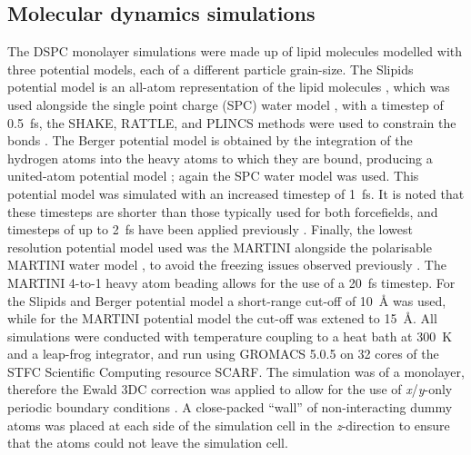 \documentclass[amsmath,amssymb,twocolumn,superscriptaddress]{revtex4-1}
\begin{document}
\subsection{Molecular dynamics simulations}
The DSPC monolayer simulations were made up of lipid molecules modelled with three potential models, each of a different particle grain-size.
The Slipids potential model is an all-atom representation of the lipid molecules \cite{jambeck_derivation_2012}, which was used alongside the single point charge (SPC) water model \cite{berendsen_missing_1987}, with a timestep of \SI{0.5}{\femto\second}, the SHAKE, RATTLE, and PLINCS methods were used to constrain the  bonds \cite{miyamoto_settle_1992,hess_p-lincs_2008}.
The Berger potential model is obtained by the integration of the hydrogen atoms into the heavy atoms to which they are bound, producing a united-atom potential model \cite{berger_molecular_1997}; again the SPC water model was used.
This potential model was simulated with an increased timestep of \SI{1}{\femto\second}.
It is noted that these timesteps are shorter than those typically used for both forcefields, and timesteps of up to \SI{2}{\femto\second} have been applied previously \cite{berger_molecular_1997,jambeck_derivation_2012}.
Finally, the lowest resolution potential model used was the MARTINI \cite{marrink_martini_2007} alongside the polarisable MARTINI water model \cite{yesylevskyy_polarizable_2010}, to avoid the freezing issues observed previously \cite{koutsioubas_combined_2016}.
The MARTINI 4-to-1 heavy atom beading allows for the use of a \SI{20}{\femto\second} timestep.
For the Slipids and Berger potential model a short-range cut-off of \SI{10}{\angstrom} was used, while for the MARTINI potential model the cut-off was extened to \SI{15}{\angstrom}.
All simulations were conducted with temperature coupling to a heat bath at \SI{300}{\kelvin} and a leap-frog integrator, and run using GROMACS 5.0.5 \cite{berendsen_gromacs_1995,lindahl_gromacs_2001,van_der_spoel_gromacs_2005,hess_gromacs_2008} on 32 cores of the STFC Scientific Computing resource SCARF.
The simulation was of a monolayer, therefore the Ewald 3DC correction was applied to allow for the use of \emph{x}/\emph{y}-only periodic boundary conditions \cite{yeh_ewald_1999}.
A close-packed ``wall'' of non-interacting dummy atoms was placed at each side of the simulation cell in the \emph{z}-direction to ensure that the atoms could not leave the simulation cell.
\end{document}
